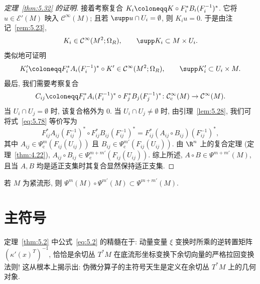 \begin{proof}[定理~\ref{thm:5.32} 的证明]
接着考察复合 $K_i \defeq K \circ F_i^* B_i (F_i^{-1})^*$. 它将 $u \in \mathscr{E}'(M)$ 映入 $\mathcal{C}^\infty(M)$; 且若 $\supp u \cap U_i = \emptyset$, 则 $K_i u = 0$. 于是由注记~\ref{rem:5.23},
\begin{equation}\label{eq:5.76}
    K_i \in \mathcal{C}^\infty(M^2; \Omega_R), \qquad \supp K_i \subset M \times U_i.
\end{equation}
类似地可证明
\begin{equation}\label{eq:5.77}
    K'_i \defeq F_i^* A_i (F_i^{-1})^* \circ K' \in \mathcal{C}^\infty(M^2; \Omega_R), \qquad \supp K'_i \subset U_i \times M.
\end{equation}
最后, 我们需要考察复合
\begin{equation}\label{eq:5.78}
    C_{ij} \defeq F_i^* A_i (F_i^{-1})^* \circ F_j^* B_j (F_j^{-1})^* \colon \SmoothComp(M) \to \mathcal{C}^\infty(M).
\end{equation}
当 $U_i \cap U_j = \emptyset$ 时, 该复合格外为 0. 当 $U_i \cap U_j \neq \emptyset$ 时, 由引理~\ref{lem:5.28}, 我们可将式~\eqref{eq:5.78} 等价写为
\begin{equation}\label{eq:5.79}
    F_{ij}^* A_{ij} (F_{ij}^{-1})^* \circ F_{ij}^* B_{ij} (F_{ij}^{-1})^* = F_{ij}^* (A_{ij} \circ B_{ij}) (F_{ij}^{-1})^*,
\end{equation}
其中 $A_{ij} \in \Psi_{\mathrm{c}}^m(F_{ij}(U_{ij}))$ 且 $B_{ij} \in \Psi_{\mathrm{c}}^{m'}(F_{ij}(U_{ij}))$. 由 $\R^n$ 上的复合定理 (定理~\ref{thm:4.22}), $A_{ij} \circ B_{ij} \in \Psi_{\mathrm{c}}^{m+m'}(F_{ij}(U_{ij}))$. 综上所述, $A \circ B \in \Psi^{m+m'}(M)$, 且当 $A, B$ 均是适正支集时其复合显然保持适正支集.
\end{proof}

\begin{corollary}[紧流形上的复合]\label{cor:5.34}
若 $M$ 为紧流形, 则 $\Psi^m(M) \circ \Psi^{m'}(M) \subset \Psi^{m+m'}(M)$.
\end{corollary}

\section{主符号}\label{sec:5.5}
%

定理~\ref{thm:5.2} 中公式~\eqref{eq:5.2} 的精髓在于: 动量变量 $\xi$ 变换时所乘的逆转置矩阵 $(\kappa'(x)^T)^{-1}$, 恰恰是余切丛 $T^* M$ 在底流形坐标变换下余切向量的严格拉回变换法则! 这从根本上揭示出: 伪微分算子的主符号天生是定义在余切丛 $T^* M$ 上的几何对象.

